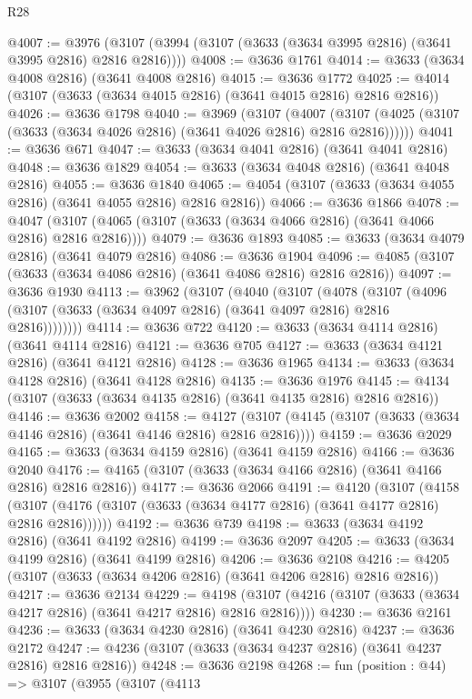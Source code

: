 \begin{lexlean}{R28}
\begin{coremodule}
@4007 := @3976 (@3107 (@3994 (@3107 (@3633 (@3634 @3995 @2816) (@3641 @3995 @2816) @2816 @2816))))
@4008 := @3636 @1761
@4014 := @3633 (@3634 @4008 @2816) (@3641 @4008 @2816)
@4015 := @3636 @1772
@4025 := @4014 (@3107 (@3633 (@3634 @4015 @2816) (@3641 @4015 @2816) @2816 @2816))
@4026 := @3636 @1798
@4040 := @3969
    (@3107
      (@4007 (@3107 (@4025 (@3107 (@3633 (@3634 @4026 @2816) (@3641 @4026 @2816) @2816 @2816))))))
@4041 := @3636 @671
@4047 := @3633 (@3634 @4041 @2816) (@3641 @4041 @2816)
@4048 := @3636 @1829
@4054 := @3633 (@3634 @4048 @2816) (@3641 @4048 @2816)
@4055 := @3636 @1840
@4065 := @4054 (@3107 (@3633 (@3634 @4055 @2816) (@3641 @4055 @2816) @2816 @2816))
@4066 := @3636 @1866
@4078 := @4047 (@3107 (@4065 (@3107 (@3633 (@3634 @4066 @2816) (@3641 @4066 @2816) @2816 @2816))))
@4079 := @3636 @1893
@4085 := @3633 (@3634 @4079 @2816) (@3641 @4079 @2816)
@4086 := @3636 @1904
@4096 := @4085 (@3107 (@3633 (@3634 @4086 @2816) (@3641 @4086 @2816) @2816 @2816))
@4097 := @3636 @1930
@4113 := @3962
    (@3107
      (@4040
        (@3107
          (@4078
            (@3107 (@4096 (@3107 (@3633 (@3634 @4097 @2816) (@3641 @4097 @2816) @2816 @2816))))))))
@4114 := @3636 @722
@4120 := @3633 (@3634 @4114 @2816) (@3641 @4114 @2816)
@4121 := @3636 @705
@4127 := @3633 (@3634 @4121 @2816) (@3641 @4121 @2816)
@4128 := @3636 @1965
@4134 := @3633 (@3634 @4128 @2816) (@3641 @4128 @2816)
@4135 := @3636 @1976
@4145 := @4134 (@3107 (@3633 (@3634 @4135 @2816) (@3641 @4135 @2816) @2816 @2816))
@4146 := @3636 @2002
@4158 := @4127 (@3107 (@4145 (@3107 (@3633 (@3634 @4146 @2816) (@3641 @4146 @2816) @2816 @2816))))
@4159 := @3636 @2029
@4165 := @3633 (@3634 @4159 @2816) (@3641 @4159 @2816)
@4166 := @3636 @2040
@4176 := @4165 (@3107 (@3633 (@3634 @4166 @2816) (@3641 @4166 @2816) @2816 @2816))
@4177 := @3636 @2066
@4191 := @4120
    (@3107
      (@4158 (@3107 (@4176 (@3107 (@3633 (@3634 @4177 @2816) (@3641 @4177 @2816) @2816 @2816))))))
@4192 := @3636 @739
@4198 := @3633 (@3634 @4192 @2816) (@3641 @4192 @2816)
@4199 := @3636 @2097
@4205 := @3633 (@3634 @4199 @2816) (@3641 @4199 @2816)
@4206 := @3636 @2108
@4216 := @4205 (@3107 (@3633 (@3634 @4206 @2816) (@3641 @4206 @2816) @2816 @2816))
@4217 := @3636 @2134
@4229 := @4198 (@3107 (@4216 (@3107 (@3633 (@3634 @4217 @2816) (@3641 @4217 @2816) @2816 @2816))))
@4230 := @3636 @2161
@4236 := @3633 (@3634 @4230 @2816) (@3641 @4230 @2816)
@4237 := @3636 @2172
@4247 := @4236 (@3107 (@3633 (@3634 @4237 @2816) (@3641 @4237 @2816) @2816 @2816))
@4248 := @3636 @2198
@4268 := fun (position : @44) =>
  @3107
    (@3955
      (@3107
        (@4113

\end{coremodule}
\end{lexlean}
